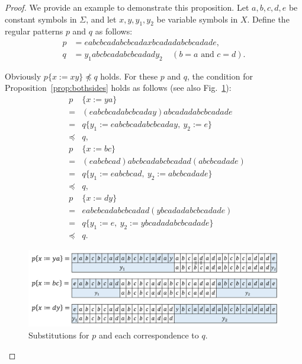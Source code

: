 \begin{proof}
We provide an example to demonstrate this proposition.
Let $a,b,c,d,e$ be constant symbols in $\Sigma$, and let 
$x,y,y_{1},y_{2}$ be variable symbols in $X$.
Define the regular patterns $p$ and $q$ as follows:
\begin{align*}
p &= eabcbcadabcbcadaxbcadadabcbcadade,\\
q &= y_{1}abcbcadabcbcadady_{2}~~~~~(b = a\mbox{~and~}c = d).
\end{align*}

\noindent
Obviously $p \{ x:=xy \} \not \preceq q$ holds.
For these $p$ and $q$, the condition for Proposition~\ref{prop:bothsides} holds as follows (see also {\color{red} Fig.~\ref{fig:cex-bacd}}):
\begin{eqnarray*}
&p& \{ x:=ya \} \\ 
& = & (eabcbcadabcbcaday)abcadadabcbcadade\\
& = & q \{ y_{1} := eabcbcadabcbcaday,~y_{2}:=e \} \\
& \preceq & q,\\
&p& \{ x:=bc \}  \\
& = & (eabcbcad)abcbcadabcbcadad(abcbcadade) \\
& = & q \{ y_{1} := eabcbcad,~y_{2} := abcbcadade \} \\
& \preceq & q,\\
&p& \{ x:=dy \}  \\
& = & eabcbcadabcbcadad(ybcadadabcbcadade) \\
& = & q \{ y_{1}:=e,~y_{2} := ybcadadabcbcadade \} \\
& \preceq & q.
\end{eqnarray*}

\begin{figure}[t]
  \begin{center}
  \includegraphics[scale=0.45]{figs/new-Exam_b=a_c=d.png}
  \end{center}
  \caption{Substitutions for $p$ and each correspondence to $q$.}
  \label{fig:cex-bacd}
\end{figure}

\end{proof}

